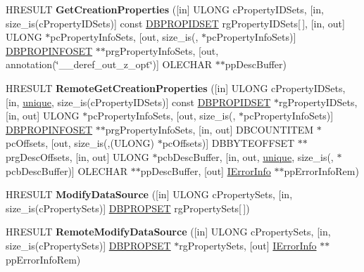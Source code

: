 \begin{DoxyCompactItemize}
\item 
\mbox{\label{interface_i_d_b_data_source_admin_a9b5790730875f789f6ea8a9131092558}} 
H\+R\+E\+S\+U\+LT {\bfseries Get\+Creation\+Properties} (\mbox{[}in\mbox{]} U\+L\+O\+NG c\+Property\+I\+D\+Sets, \mbox{[}in, size\+\_\+is(c\+Property\+I\+D\+Sets)\mbox{]} const \hyperlink{structtag_d_b_p_r_o_p_i_d_s_e_t}{D\+B\+P\+R\+O\+P\+I\+D\+S\+ET} rg\+Property\+I\+D\+Sets\mbox{[}$\,$\mbox{]}, \mbox{[}in, out\mbox{]} U\+L\+O\+NG $\ast$pc\+Property\+Info\+Sets, \mbox{[}out, size\+\_\+is(, $\ast$pc\+Property\+Info\+Sets)\mbox{]} \hyperlink{structtag_d_b_p_r_o_p_i_n_f_o_s_e_t}{D\+B\+P\+R\+O\+P\+I\+N\+F\+O\+S\+ET} $\ast$$\ast$prg\+Property\+Info\+Sets, \mbox{[}out, annotation(\char`\"{}\+\_\+\+\_\+deref\+\_\+out\+\_\+z\+\_\+opt\char`\"{})\mbox{]} O\+L\+E\+C\+H\+AR $\ast$$\ast$pp\+Desc\+Buffer)
\item 
\mbox{\label{interface_i_d_b_data_source_admin_acb17d9ffdb07a2b63698db738305722f}} 
H\+R\+E\+S\+U\+LT {\bfseries Remote\+Get\+Creation\+Properties} (\mbox{[}in\mbox{]} U\+L\+O\+NG c\+Property\+I\+D\+Sets, \mbox{[}in, \hyperlink{interfaceunique}{unique}, size\+\_\+is(c\+Property\+I\+D\+Sets)\mbox{]} const \hyperlink{structtag_d_b_p_r_o_p_i_d_s_e_t}{D\+B\+P\+R\+O\+P\+I\+D\+S\+ET} $\ast$rg\+Property\+I\+D\+Sets, \mbox{[}in, out\mbox{]} U\+L\+O\+NG $\ast$pc\+Property\+Info\+Sets, \mbox{[}out, size\+\_\+is(, $\ast$pc\+Property\+Info\+Sets)\mbox{]} \hyperlink{structtag_d_b_p_r_o_p_i_n_f_o_s_e_t}{D\+B\+P\+R\+O\+P\+I\+N\+F\+O\+S\+ET} $\ast$$\ast$prg\+Property\+Info\+Sets, \mbox{[}in, out\mbox{]} D\+B\+C\+O\+U\+N\+T\+I\+T\+EM $\ast$pc\+Offsets, \mbox{[}out, size\+\_\+is(,(U\+L\+O\+NG) $\ast$pc\+Offsets)\mbox{]} D\+B\+B\+Y\+T\+E\+O\+F\+F\+S\+ET $\ast$$\ast$prg\+Desc\+Offsets, \mbox{[}in, out\mbox{]} U\+L\+O\+NG $\ast$pcb\+Desc\+Buffer, \mbox{[}in, out, \hyperlink{interfaceunique}{unique}, size\+\_\+is(, $\ast$pcb\+Desc\+Buffer)\mbox{]} O\+L\+E\+C\+H\+AR $\ast$$\ast$pp\+Desc\+Buffer, \mbox{[}out\mbox{]} \hyperlink{interface_i_error_info}{I\+Error\+Info} $\ast$$\ast$pp\+Error\+Info\+Rem)
\item 
\mbox{\label{interface_i_d_b_data_source_admin_a4e6ea1243d5193e2647bcef374c04266}} 
H\+R\+E\+S\+U\+LT {\bfseries Modify\+Data\+Source} (\mbox{[}in\mbox{]} U\+L\+O\+NG c\+Property\+Sets, \mbox{[}in, size\+\_\+is(c\+Property\+Sets)\mbox{]} \hyperlink{structtag_d_b_p_r_o_p_s_e_t}{D\+B\+P\+R\+O\+P\+S\+ET} rg\+Property\+Sets\mbox{[}$\,$\mbox{]})
\item 
\mbox{\label{interface_i_d_b_data_source_admin_a628e70bdf0aca69addf7a957dcb528dd}} 
H\+R\+E\+S\+U\+LT {\bfseries Remote\+Modify\+Data\+Source} (\mbox{[}in\mbox{]} U\+L\+O\+NG c\+Property\+Sets, \mbox{[}in, size\+\_\+is(c\+Property\+Sets)\mbox{]} \hyperlink{structtag_d_b_p_r_o_p_s_e_t}{D\+B\+P\+R\+O\+P\+S\+ET} $\ast$rg\+Property\+Sets, \mbox{[}out\mbox{]} \hyperlink{interface_i_error_info}{I\+Error\+Info} $\ast$$\ast$pp\+Error\+Info\+Rem)
\end{DoxyCompactItemize}
